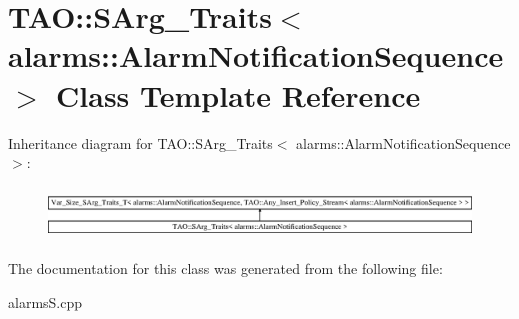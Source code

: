 \section{T\+AO\+:\+:S\+Arg\+\_\+\+Traits$<$ alarms\+:\+:Alarm\+Notification\+Sequence $>$ Class Template Reference}
\label{classTAO_1_1SArg__Traits_3_01alarms_1_1AlarmNotificationSequence_01_4}
Inheritance diagram for T\+AO\+:\+:S\+Arg\+\_\+\+Traits$<$ alarms\+:\+:Alarm\+Notification\+Sequence $>$\+:\begin{figure}[H]
\begin{center}
\leavevmode
\includegraphics[height=1.421320cm]{classTAO_1_1SArg__Traits_3_01alarms_1_1AlarmNotificationSequence_01_4}
\end{center}
\end{figure}


The documentation for this class was generated from the following file\+:\begin{DoxyCompactItemize}
\item 
alarms\+S.\+cpp\end{DoxyCompactItemize}
